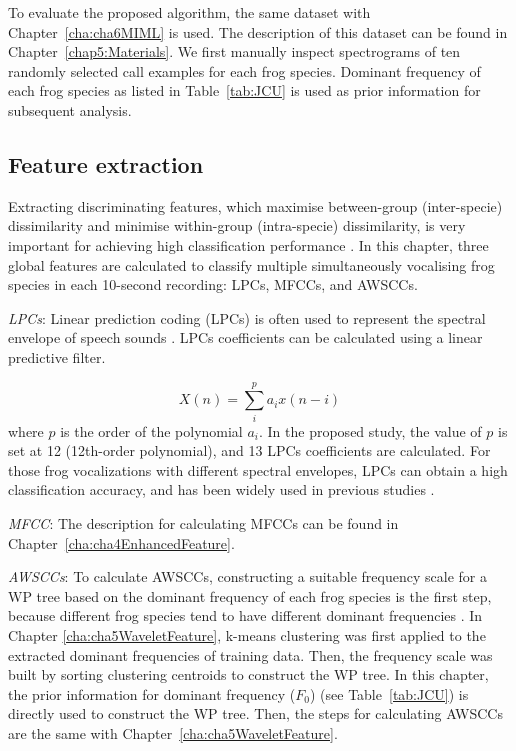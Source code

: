 To evaluate the proposed algorithm, the same dataset with Chapter~\ref{cha:cha6MIML} is used. The description of this dataset can be found in Chapter~\ref{chap5:Materials}. We first manually inspect spectrograms of ten randomly selected call examples for each frog species. Dominant frequency of each frog species as listed in Table~\ref{tab:JCU} is used as prior information for subsequent analysis.



\subsection{Feature extraction}
Extracting discriminating features, which maximise between-group (inter-specie) dissimilarity and minimise within-group (intra-specie) dissimilarity, is very important for achieving high classification performance \citep{huang2009frog, bedoya2014automatic}. In this chapter, three global features are calculated to classify multiple simultaneously vocalising frog species in each 10-second recording: LPCs, MFCCs, and AWSCCs. 


\textit{LPCs}: Linear prediction coding (LPCs) is often used to represent the spectral envelope of speech sounds \citep{itakura1975line}. LPCs coefficients can be calculated using a linear predictive filter.

\begin{equation}
X(n) = \sum_{i}^{p}a_{i}x(n-i)
\end{equation}
where $p$ is the order of the polynomial $a_{i}$. In the proposed study, the value of $p$ is set at 12 (12th-order polynomial), and 13 LPCs coefficients are calculated. For those frog vocalizations with different spectral envelopes, LPCs can obtain a high classification accuracy, and has been widely used in previous studies \cite{yuan2013frog, jaafarcomparative, jaafar2015effect}.

\textit{MFCC}: The description for calculating MFCCs can be found in Chapter~\ref{cha:cha4EnhancedFeature}. 


\textit{AWSCCs}: To calculate AWSCCs, constructing a suitable frequency scale for a WP tree based on the dominant frequency of each frog species is the first step, because different frog species tend to have different dominant frequencies \citep{Gingras2013}. In Chapter \ref{cha:cha5WaveletFeature}, k-means clustering was first applied to the extracted dominant frequencies of training data. Then, the frequency scale was built by sorting clustering centroids to construct the WP tree. In this chapter, the prior information for dominant frequency ($F_{0}$) (see Table~\ref{tab:JCU}) is directly used to construct the WP tree. Then, the steps for calculating AWSCCs are the same with Chapter~\ref{cha:cha5WaveletFeature}. 

